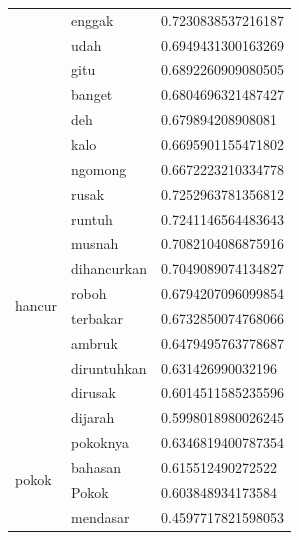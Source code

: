 \begin{enumerate}
\begin{longtable}[c]{|l|l|l|}
                                  & enggak          & 0.7230838537216187  \\ \cline{2-3}
                                  & udah            & 0.6949431300163269  \\ \cline{2-3}
                                  & gitu            & 0.6892260909080505  \\ \cline{2-3}
                                  & banget          & 0.6804696321487427  \\ \cline{2-3}
                                  & deh             & 0.679894208908081   \\ \cline{2-3}
                                  & kalo            & 0.6695901155471802  \\ \cline{2-3}
                                  & ngomong         & 0.6672223210334778  \\ \hline
    \multirow[t]{10}{*}{hancur}   & rusak           & 0.7252963781356812  \\ \cline{2-3}
                                  & runtuh          & 0.7241146564483643  \\ \cline{2-3}
                                  & musnah          & 0.7082104086875916  \\ \cline{2-3}
                                  & dihancurkan     & 0.7049089074134827  \\ \cline{2-3}
                                  & roboh           & 0.6794207096099854  \\ \cline{2-3}
                                  & terbakar        & 0.6732850074768066  \\ \cline{2-3}
                                  & ambruk          & 0.6479495763778687  \\ \cline{2-3}
                                  & diruntuhkan     & 0.631426990032196   \\ \cline{2-3}
                                  & dirusak         & 0.6014511585235596  \\ \cline{2-3}
                                  & dijarah         & 0.5998018980026245  \\ \hline
    \multirow[t]{10}{*}{pokok}    & pokoknya        & 0.6346819400787354  \\ \cline{2-3}
                                  & bahasan         & 0.615512490272522   \\ \cline{2-3}
                                  & Pokok           & 0.603848934173584   \\ \cline{2-3}
                                  & mendasar        & 0.4597717821598053  \\ \cline{2-3}

\end{longtable}
\end{enumerate}
